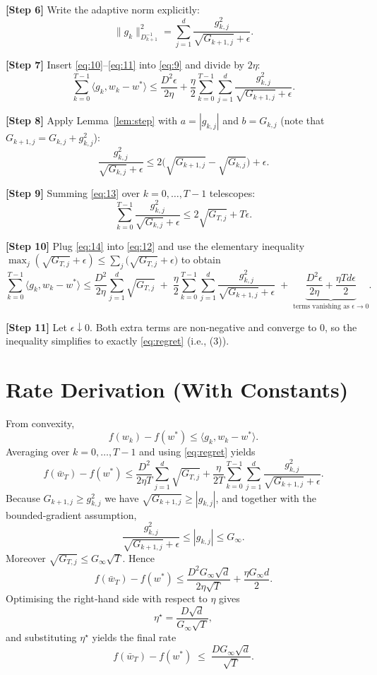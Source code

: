 \documentclass{article}
\newcommand{\inner}[2]{\langle #1,#2\rangle}
\begin{document}
\noindent\textbf{[Step 6]} Write the adaptive norm explicitly:
\[
\|g_{k}\|_{D_{k+1}^{-1}}^{2}
= \sum_{j=1}^{d}\frac{g_{k,j}^{2}}{\sqrt{G_{k+1,j}}+\epsilon}.
\tag{11}
\]

\noindent\textbf{[Step 7]} Insert \eqref{eq:10}–\eqref{eq:11} into \eqref{eq:9} and divide by $2\eta$:
\[
\sum_{k=0}^{T-1}\inner{g_{k}}{w_{k}-w^{*}}
\le \frac{D^{2}\epsilon}{2\eta}
+\frac{\eta}{2}\sum_{k=0}^{T-1}\sum_{j=1}^{d}\frac{g_{k,j}^{2}}{\sqrt{G_{k+1,j}}+\epsilon}.
\tag{12}
\]

\noindent\textbf{[Step 8]} Apply Lemma~\ref{lem:step} with $a=|g_{k,j}|$ and $b=G_{k,j}$ (note that $G_{k+1,j}=G_{k,j}+g_{k,j}^{2}$):
\[
\frac{g_{k,j}^{2}}{\sqrt{G_{k,j}}+\epsilon}
\le 2\bigl(\sqrt{G_{k+1,j}}-\sqrt{G_{k,j}}\bigr)+\epsilon .
\tag{13}
\]

\noindent\textbf{[Step 9]} Summing \eqref{eq:13} over $k=0,\dots,T-1$ telescopes:
\[
\sum_{k=0}^{T-1}\frac{g_{k,j}^{2}}{\sqrt{G_{k,j}}+\epsilon}
\le 2\sqrt{G_{T,j}}+T\epsilon .
\tag{14}
\]

\noindent\textbf{[Step 10]} Plug \eqref{eq:14} into \eqref{eq:12} and use the elementary inequality
$\max_{j}(\sqrt{G_{T,j}}+\epsilon)\le \sum_{j}\bigl(\sqrt{G_{T,j}}+\epsilon\bigr)$ to obtain
\[
\sum_{k=0}^{T-1}\inner{g_{k}}{w_{k}-w^{*}}
\le
\frac{D^{2}}{2\eta}\sum_{j=1}^{d}\sqrt{G_{T,j}}
\;+\;
\frac{\eta}{2}\sum_{k=0}^{T-1}\sum_{j=1}^{d}\frac{g_{k,j}^{2}}{\sqrt{G_{k+1,j}}+\epsilon}
\;+\;
\underbrace{\frac{D^{2}\epsilon}{2\eta}+\frac{\eta T d\epsilon}{2}}_{\text{terms vanishing as }\epsilon\to0}.
\tag{15}
\]

\noindent\textbf{[Step 11]} Let $\epsilon\downarrow0$. Both extra terms are non‑negative and converge to $0$, so the inequality simplifies to exactly \eqref{eq:regret} (i.e., (3)). \qedhere

\section*{Rate Derivation (With Constants)}
From convexity,
\[
f(w_{k})-f(w^{*})\le\inner{g_{k}}{w_{k}-w^{*}}.
\]
Averaging over $k=0,\dots,T-1$ and using \eqref{eq:regret} yields
\[
f(\bar w_{T})-f(w^{*})
\le\frac{D^{2}}{2\eta T}\sum_{j=1}^{d}\sqrt{G_{T,j}}
+\frac{\eta}{2T}\sum_{k=0}^{T-1}\sum_{j=1}^{d}\frac{g_{k,j}^{2}}{\sqrt{G_{k+1,j}}+\epsilon}.
\]
Because $G_{k+1,j}\ge g_{k,j}^{2}$ we have $\sqrt{G_{k+1,j}}\ge|g_{k,j}|$, and together with the bounded‑gradient assumption,
\[
\frac{g_{k,j}^{2}}{\sqrt{G_{k+1,j}}+\epsilon}\le |g_{k,j}|\le G_{\infty}.
\]
Moreover $\sqrt{G_{T,j}}\le G_{\infty}\sqrt{T}$. Hence
\[
f(\bar w_{T})-f(w^{*})
\le\frac{D^{2}G_{\infty}\sqrt{d}}{2\eta\sqrt{T}}
+\frac{\eta G_{\infty}d}{2}.
\]
Optimising the right‑hand side with respect to $\eta$ gives
\[
\eta^{\star}= \frac{D\sqrt{d}}{G_{\infty}\sqrt{T}},
\]
and substituting $\eta^{\star}$ yields the final rate
\[
f(\bar w_{T})-f(w^{*})\;\le\; \frac{DG_{\infty}\sqrt{d}}{\sqrt{T}}.
\tag{17}
\]
\end{document}

